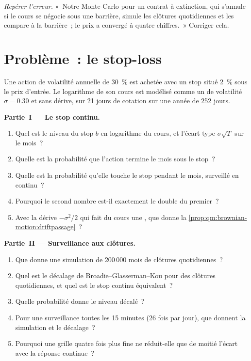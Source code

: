 \begin{exercise}[$\star\star\star$]\label{exo:qm:brownian-motion:8}
\emph{Repérer l'erreur.} «~Notre Monte-Carlo pour un contrat à extinction, qui s'annule si le cours
se négocie sous une barrière, simule les clôtures quotidiennes et les compare à la barrière~; le prix
a convergé à quatre chiffres.~» Corriger cela.
\end{exercise}

\section{Problème~: le stop-loss}

\begin{problem}\label{pb:qm:brownian-motion:1}
Une action de volatilité annuelle de 30~\% est achetée avec un stop situé 2~\% sous le prix d'entrée. Le logarithme
de son cours est modélisé comme un  de volatilité $\sigma = 0.30$ et sans dérive, sur 21
jours de cotation sur une année de 252 jours.

\medskip\noindent\textbf{Partie~I --- Le stop continu.}
\begin{enumerate}
\item Quel est le niveau du stop $b$ en logarithme du cours, et l'écart type $\sigma\sqrt T$ sur le mois~?
\item Quelle est la probabilité que l'action termine le mois sous le stop~?
\item Quelle est la probabilité qu'elle touche le stop pendant le mois, surveillé en continu~?
\item Pourquoi le second nombre est-il exactement le double du premier~?
\item Avec la dérive $-\sigma^2/2$ qui fait du cours une , que donne la \cref{prop:qm:brownian-motion:driftpassage}~?
\end{enumerate}

\medskip\noindent\textbf{Partie~II --- Surveillance aux clôtures.}
\begin{enumerate}[resume]
\item Que donne une simulation de 200\,000 mois de clôtures quotidiennes~?
\item Quel est le décalage de Broadie--Glasserman--Kou pour des clôtures quotidiennes, et quel est le stop continu équivalent~?
\item Quelle probabilité donne le niveau décalé~?
\item Pour une surveillance toutes les 15 minutes (26 fois par jour), que donnent la simulation et le décalage~?
\item Pourquoi une grille quatre fois plus fine ne réduit-elle que de moitié l'écart avec la réponse continue~?
\end{enumerate}


\end{problem}
